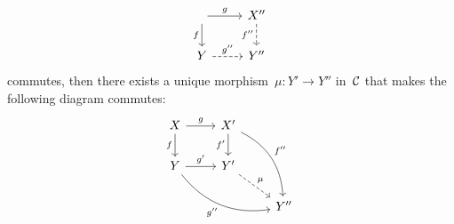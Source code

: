 \begin{definition*}
\begin{enumerate}
\begin{enumerate}[label=(PO\arabic*)]
\[\begin{tikzcd}
                \arrow{r}[above]{g}
                \arrow{d}[left]{f}
              & X''
                \arrow[dashed]{d}[left]{f''}
              \\
                Y
                \arrow[dashed]{r}[above]{g''}
              & Y''
            \end{tikzcd}
          \]
          commutes, then there exists a unique morphism~$\mu \colon Y' \to Y''$ in~$\mathcal{C}$ that makes the following diagram commutes:
          \[
            \begin{tikzcd}
                X
                \arrow{r}[above]{g}
                \arrow{d}[left]{f}
              & X'
                \arrow[bend left]{ddr}[above right]{f''}
                \arrow{d}[left]{f'}
              & {}
              \\
                Y
                \arrow{r}[above]{g'}
                \arrow[bend right]{drr}[below left]{g''}
              & Y'
                \arrow[dashed]{dr}[above right]{\mu}
              & {}
              \\
                {}
              & {}
              & Y''
            \end{tikzcd}
          \]
      \end{enumerate}
  \end{enumerate}
\end{definition*}


